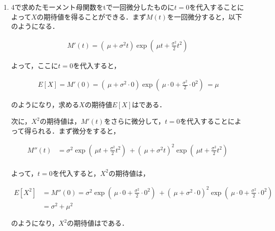 \documentclass[a4paper,10pt]{jarticle}
\begin{document}
\begin{enumerate}
\item  4で求めたモーメント母関数をtで一回微分したものに$t=0$を代入することによって$X$の期待値を得ることができる．まず$M(t)$を一回微分すると，以下のようになる．

\begin{equation}
\label{equ23}
\begin{split}
M'(t) = \left(\ \mu + \sigma^2t\right)\exp\left(\ \mu t+ \frac{\sigma^2}{2}t^2\right)\
\end{split}
\end{equation}

よって，ここに$t=0$を代入すると，

\begin{equation} 
\label{equ24}
\begin{split}
E[X] = M'(0) =\left(\ \mu + \sigma^2\cdot 0\right)\exp\left(\ \mu \cdot 0+ \frac{\sigma^2}{2}\cdot 0^2\right)\ = \mu
\end{split}
\end{equation}

のようになり，求める$X$の期待値$E[X]$は\fbox{$\mu$}である．

次に，$X^2$の期待値は，$M'(t)$をさらに微分して，$t=0$を代入することによって得られる．まず微分をすると，

\begin{equation}
\label{equ25}
\begin{split}
M''(t) &= \sigma^2 \exp\left(\ \mu t+ \frac{\sigma^2}{2} t^2\right)\ + \left(\ \mu + \sigma^2t\right)^2 \exp\left(\ \mu t+ \frac{\sigma^2}{2}t^2\right)\ \\
\end{split}
\end{equation}

よって，$t=0$を代入すると，$X^2$の期待値は，

\begin{equation}
\label{equ9}
\begin{split}
E[X^2] &= M''(0) = \sigma^2 \exp\left(\ \mu \cdot 0+ \frac{\sigma^2}{2} \cdot 0^2\right)\ + \left(\ \mu + \sigma^2\cdot 0\right)^2 \exp\left(\ \mu \cdot 0+ \frac{\sigma^2}{2}\cdot 0^2\right)\ \\
			 &= \sigma^2 + \mu^2
\end{split}
\end{equation}

のようになり，$X^2$の期待値はである．

\vspace{6mm}



\end{enumerate}
\end{document}
